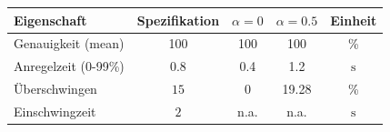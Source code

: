 \begin{table}[h!]
	\centering
	\begin{tabular}{l c c c c}
		Eigenschaft
			& Spezifikation
			& $\alpha = 0$
			& $\alpha = 0.5$
			& Einheit \\
		\hline
		Genauigkeit (mean)
			& 100
			& 100 
			& 100
			& \% \\
		Anregelzeit (0-99\%)
			& $0.8$
			& 0.4
			& 1.2
			& $\si{\second}$ \\
		Überschwingen
			& $15$
			& 0
			& 19.28
			& \% \\
		Einschwingzeit
			& $2$
			& n.a. 
			& n.a.
			& $\si{\second}$ \\
	\end{tabular}
\end{table}
